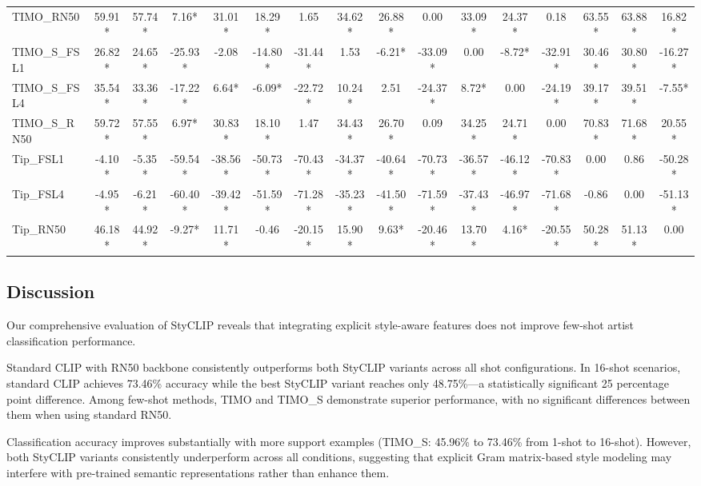 \documentclass[conference,6pt]{IEEEtran}
\begin{document}
\begin{table}[H]
{\begin{tabular}{@{}l*{15}{c}@{}}
TIMO\_RN50 & 59.91* & 57.74* & 7.16* & 31.01* & 18.29* & 1.65 & 34.62* & 26.88* & 0.00 & 33.09* & 24.37* & 0.18 & 63.55* & 63.88* & 16.82* \\
TIMO\_S\_FSL1 & 26.82* & 24.65* & -25.93* & -2.08 & -14.80* & -31.44* & 1.53 & -6.21* & -33.09* & 0.00 & -8.72* & -32.91* & 30.46* & 30.80* & -16.27* \\
TIMO\_S\_FSL4 & 35.54* & 33.36* & -17.22* & 6.64* & -6.09* & -22.72* & 10.24* & 2.51 & -24.37* & 8.72* & 0.00 & -24.19* & 39.17* & 39.51* & -7.55* \\
TIMO\_S\_RN50 & 59.72* & 57.55* & 6.97* & 30.83* & 18.10* & 1.47 & 34.43* & 26.70* & 0.09 & 34.25* & 24.71* & 0.00 & 70.83* & 71.68* & 20.55* \\
Tip\_FSL1 & -4.10* & -5.35* & -59.54* & -38.56* & -50.73* & -70.43* & -34.37* & -40.64* & -70.73* & -36.57* & -46.12* & -70.83* & 0.00 & 0.86 & -50.28* \\
Tip\_FSL4 & -4.95* & -6.21* & -60.40* & -39.42* & -51.59* & -71.28* & -35.23* & -41.50* & -71.59* & -37.43* & -46.97* & -71.68* & -0.86 & 0.00 & -51.13* \\
Tip\_RN50 & 46.18* & 44.92* & -9.27* & 11.71* & -0.46 & -20.15* & 15.90* & 9.63* & -20.46* & 13.70* & 4.16* & -20.55* & 50.28* & 51.13* & 0.00 \\
\bottomrule
\end{tabular}%
}
\end{table}

\FloatBarrier



\subsection{Discussion}


Our comprehensive evaluation of StyCLIP reveals that integrating explicit style-aware features does not improve few-shot artist classification performance. 

Standard CLIP with RN50 backbone consistently outperforms both StyCLIP variants across all shot configurations. In 16-shot scenarios, standard CLIP achieves 73.46\% accuracy while the best StyCLIP variant reaches only 48.75\%—a statistically significant 25 percentage point difference. Among few-shot methods, TIMO and TIMO\_S demonstrate superior performance, with no significant differences between them when using standard RN50.

Classification accuracy improves substantially with more support examples (TIMO\_S: 45.96\% to 73.46\% from 1-shot to 16-shot). However, both StyCLIP variants consistently underperform across all conditions, suggesting that explicit Gram matrix-based style modeling may interfere with pre-trained semantic representations rather than enhance them.
\end{document}
